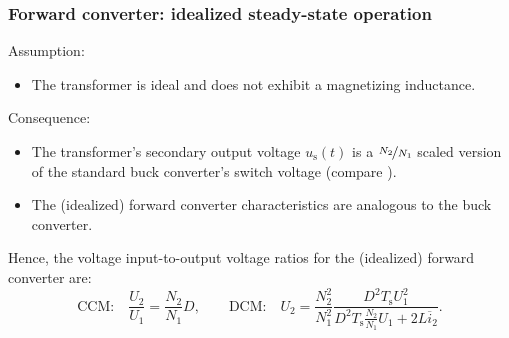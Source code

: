 \begin{frame}
    \frametitle{Forward converter: idealized steady-state operation}
    Assumption:
    \begin{itemize}
        \item The transformer is ideal and does not exhibit a magnetizing inductance.
    \end{itemize}
    Consequence:
    \begin{itemize}
        \item The transformer's secondary output voltage $u_\mathrm{s}(t)$ is a $\nicefrac{N_2}{N_1}$ scaled version of the standard buck converter's switch voltage (compare ).
        \item The (idealized) forward converter characteristics are analogous to the buck converter.
    \end{itemize}
    Hence, the voltage input-to-output voltage ratios for the (idealized) forward converter are:
    \begin{equation}
        \mbox{CCM:}\quad \frac{U_2}{U_1} = \frac{N_2}{N_1}D, \qquad \mbox{DCM:}\quad U_2 = \frac{N_2^2}{N_1^2}\frac{D^2T_\mathrm{s}U_1^2}{D^2T_\mathrm{s}\frac{N_2}{N_1}U_1+2L\overline{i}_2}.
    \end{equation}
\end{frame}

